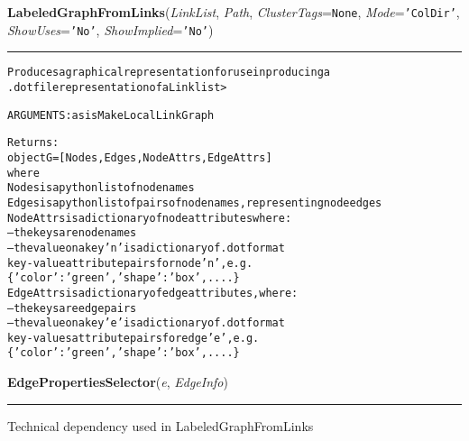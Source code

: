 \hspace{.8\funcindent}\begin{boxedminipage}{\funcwidth}

    \raggedright \textbf{LabeledGraphFromLinks}(\textit{LinkList}, \textit{Path}, \textit{ClusterTags}={\tt None}, \textit{Mode}={\tt 'ColDir'}, \textit{ShowUses}={\tt 'No'}, \textit{ShowImplied}={\tt 'No'})

    \vspace{-1.5ex}

    \rule{\textwidth}{0.5\fboxrule}
\setlength{\parskip}{2ex}
\begin{alltt}

Produces a graphical representation for use in producing a
.dot file representation of a Linklist{\textgreater}

ARGUMENTS: as is MakeLocalLinkGraph

Returns:
        object G = [Nodes,Edges,NodeAttrs,EdgeAttrs]
where
        Nodes is a python list of node names
        Edges is a python list of pairs of node names, representing node edges
        NodeAttrs is a dictionary of node attributes where:
                -- the keys are node names
                -- the value on a key 'n' is a dictionary of .dot format 
                key-value attribute pairs for node 'n', e.g. 
                \{'color':'green','shape':'box', .... \} 
        EdgeAttrs is a dictionary of edge  attributes, where:
                -- the keys are edge pairs
                -- the value on a key 'e' is a dictionary of .dot format 
                key-values attribute pairs for edge 'e', e.g. 
                \{'color':'green','shape':'box', .... \} 
\end{alltt}

\setlength{\parskip}{1ex}
    \end{boxedminipage}

    \label{System:SystemGraphOperations:EdgePropertiesSelector}

    \vspace{0.5ex}

\hspace{.8\funcindent}\begin{boxedminipage}{\funcwidth}

    \raggedright \textbf{EdgePropertiesSelector}(\textit{e}, \textit{EdgeInfo})

    \vspace{-1.5ex}

    \rule{\textwidth}{0.5\fboxrule}
\setlength{\parskip}{2ex}
    Technical dependency used in LabeledGraphFromLinks

\setlength{\parskip}{1ex}
    \end{boxedminipage}

